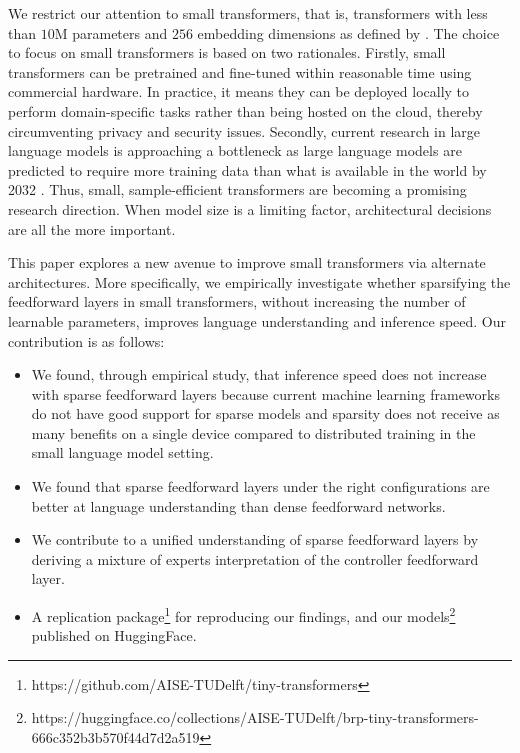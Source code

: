 We restrict our attention to small transformers, that is, transformers with less than $10\text{M}$ parameters and $256$ embedding dimensions as defined by \citet{eldan_tinystories_2023}. The choice to focus on small transformers is based on two rationales. Firstly, small transformers can be pretrained and fine-tuned within reasonable time using commercial hardware. In practice, it means they can be deployed locally to perform domain-specific tasks rather than being hosted on the cloud, thereby circumventing privacy and security issues. Secondly, current research in large language models is approaching a bottleneck as large language models are predicted to require more training data than what is available in the world by 2032 \cite{villalobos_will_2024}. Thus, small, sample-efficient transformers are becoming a promising research direction. When model size is a limiting factor, architectural decisions are all the more important.

This paper explores a new avenue to improve small transformers via alternate architectures. More specifically, we empirically investigate whether sparsifying the feedforward layers in small transformers, without increasing the number of learnable parameters, improves language understanding and inference speed. Our contribution is as follows:
\begin{itemize}
    \item We found, through empirical study, that inference speed does not increase with sparse feedforward layers because current machine learning frameworks do not have good support for sparse models and sparsity does not receive as many benefits on a single device compared to distributed training in the small language model setting.
    \item We found that sparse feedforward layers under the right configurations are better at language understanding than dense feedforward networks.
    \item We contribute to a unified understanding of sparse feedforward layers by deriving a mixture of experts interpretation of the controller feedforward layer.
    \item A replication package\footnote{https://github.com/AISE-TUDelft/tiny-transformers} for reproducing our findings, and our models\footnote{https://huggingface.co/collections/AISE-TUDelft/brp-tiny-transformers-666c352b3b570f44d7d2a519} published on HuggingFace.
\end{itemize}



